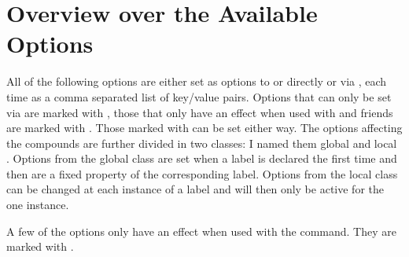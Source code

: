 \documentclass[load-preamble+,babel-options={ngerman,british,american}]{cnltx-doc}
\begin{document}
\section{Overview over the Available Options}\label{sec:overv-over-avail-1}
All of the following options are either
set as options to  or  directly or via
, each time as a comma separated list of
key/value pairs.  Options that can only be set via  are marked
with , those that only have an effect when used with  and
friends are marked with .  Those marked with  can
be set either way.  The options affecting the compounds are further divided in
two classes: I named them global  and local . Options
from the global class are set when a label is declared the first time and then
are a fixed property of the corresponding label.  Options from the local class
can be changed at each instance of a label and will then only be active for
the one instance.

A few of the options only have an effect when used with the 
command.  They are marked with .
\end{document}
